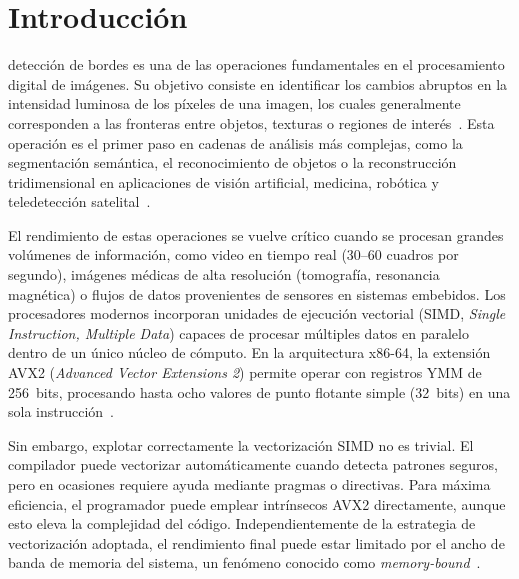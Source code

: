 \section{Introducci\'on}

 detecci\'on de bordes es una de las operaciones
fundamentales en el procesamiento digital de im\'agenes.
Su objetivo consiste en identificar los cambios abruptos en la
intensidad luminosa de los p\'ixeles de una imagen, los cuales
generalmente corresponden a las fronteras entre objetos, texturas
o regiones de inter\'es~\cite{gonzalez2008}.
Esta operaci\'on es el primer paso en cadenas de an\'alisis m\'as
complejas, como la segmentaci\'on sem\'antica, el reconocimiento
de objetos o la reconstrucci\'on tridimensional en aplicaciones
de visi\'on artificial, medicina, rob\'otica y teledetección
satelital~\cite{canny1986}.

El rendimiento de estas operaciones se vuelve cr\'itico cuando
se procesan grandes vol\'umenes de informaci\'on, como video en
tiempo real (30--60 cuadros por segundo), im\'agenes m\'edicas de
alta resoluci\'on (tomograf\'ia, resonancia magn\'etica) o flujos
de datos provenientes de sensores en sistemas embebidos.
Los procesadores modernos incorporan unidades de ejecuci\'on
vectorial (SIMD, \textit{Single Instruction, Multiple Data})
capaces de procesar m\'ultiples datos en paralelo dentro de un
\'unico n\'ucleo de c\'omputo.
En la arquitectura x86-64, la extensi\'on AVX2 (\textit{Advanced
Vector Extensions 2}) permite operar con registros YMM de 256~bits,
procesando hasta ocho valores de punto flotante simple
(32~bits) en una sola instrucci\'on~\cite{intel_intrinsics}.

Sin embargo, explotar correctamente la vectorizaci\'on SIMD no es
trivial.
El compilador puede vectorizar autom\'aticamente cuando detecta
patrones seguros, pero en ocasiones requiere ayuda mediante pragmas
o directivas.
Para m\'axima eficiencia, el programador puede emplear intr\'insecos
AVX2 directamente, aunque esto eleva la complejidad del c\'odigo.
Independientemente de la estrategia de vectorizaci\'on adoptada,
el rendimiento final puede estar limitado por el ancho de banda
de memoria del sistema, un fen\'omeno conocido como
\textit{memory-bound}~\cite{williams2009}.

